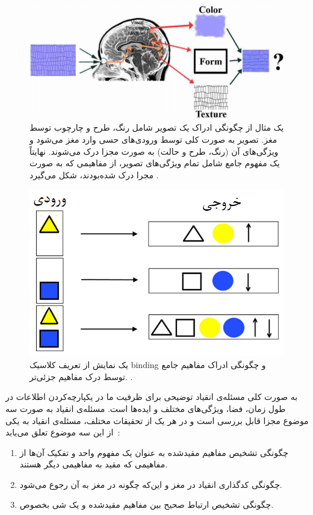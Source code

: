 \documentclass[12pt]{report}
\begin{document}
	\begin{figure}[]
		\centering
		\includegraphics[width=1.0\linewidth]{binding-neuron.png}
		\caption[NS]{
			یک مثال از چگونگی ادراک یک تصویر شامل رنگ، طرح و چارچوب توسط مغز. تصویر به صورت کلی توسط ورودی‌های حسی وارد مغز می‌شود و ویژگی‌های آن (رنگ، طرح و حالت) به صورت مجزا درک می‌شوند. نهایتاً یک مفهوم جامع شامل تمام ویژگی‌های تصویر، از مفاهیمی که به صورت مجرا درک شده‌بودند، شکل می‌گیرد \cite{Masi2021-rv}.
		}
		\label{fig:binding-neuron}
	\end{figure}
	
	\begin{figure}[]
		\centering
		\includegraphics[width=0.7\linewidth]{binding.png}
		\caption[NS]{
			یک نمایش از تعریف کلاسیک \gls{binding} و چگونگی ادراک مفاهیم جامع توسط درک مفاهیم جزئی‌تر.
			\cite{velic2012}.
		}
		\label{fig:binding}
	\end{figure}
	
	به صورت کلی مسئله‌ی انقیاد توضیحی برای ظرفیت ما در یکپارچه‌کردن اطلاعات در طول زمان، فضا، ویژگی‌های مختلف و ایده‌ها است. مسئله‌ی انقیاد به صورت سه موضوع مجزا قابل بررسی است و در هر یک از تحقیقات مختلف، مسئله‌ی انقیاد به یکی از این سه موضوع تعلق می‌یابد~\cite{Treisman1999}:
	
	\begin{enumerate}
		\item چگونگی تشخیص مفاهیم مقید‌شده به عنوان یک مفهوم واحد  و تفکیک آن‌ها از مفاهیمی که مقید به مفاهیمی دیگر هستند.
		\item چگونگی کد‌گذاری انقیاد در مغز و این‌که چگونه در مغز به آن رجوع می‌شود.
		\item چگونگی تشخیص ارتباط صحیح بین مفاهیم  مقید‌شده و یک شی بخصوص.
	\end{enumerate}
\end{document}
